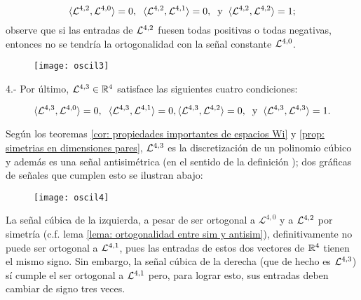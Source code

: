 \[
\langle \mathcal{L}^{4,2} , \mathcal{L}^{4,0} \rangle=0,
\hspace{0.2cm}
\langle \mathcal{L}^{4,2} , \mathcal{L}^{4,1} \rangle=0,
\hspace{0.2cm} \text{y} \hspace{0.2cm}
\langle \mathcal{L}^{4,2} , \mathcal{L}^{4,2} \rangle=1;
\]
observe que si las entradas de 
$\mathcal{L}^{4,2}$ fuesen todas positivas o todas negativas,
entonces no se tendría la ortogonalidad
con la señal constante $\mathcal{L}^{4,0}$.


\begin{figure}[H]
\texttt{[image: oscil3]}
\end{figure}

4.- Por último, $\mathcal{L}^{4,3} \in \mathbb{R}^{4}$ satisface
las siguientes cuatro condiciones: 

\[
\langle \mathcal{L}^{4,3} , \mathcal{L}^{4,0} \rangle=0,
\hspace{0.2cm}
\langle \mathcal{L}^{4,3} , \mathcal{L}^{4,1} \rangle=0,
\langle \mathcal{L}^{4,3} , \mathcal{L}^{4,2} \rangle=0,
\hspace{0.2cm} \text{y} \hspace{0.2cm}
\langle \mathcal{L}^{4,3} , \mathcal{L}^{4,3} \rangle=1.
\]

Según los teoremas 
\ref{cor: propiedades importantes de espacios Wi}
y \ref{prop: simetrias en dimensiones pares},
$\mathcal{L}^{4,3}$ es la discretización de un polinomio
cúbico y además es una señal antisimétrica (en el sentido de la definición
); dos gráficas de señales que cumplen esto se ilustran abajo:

\begin{figure}[H]
	\texttt{[image: oscil4]}
\end{figure}

La señal cúbica de la izquierda, a pesar de 
ser ortogonal a $\mathcal{L}^{4,0}$ y a $\mathcal{L}^{4,2}$ por 
simetría (c.f. lema
\ref{lema: ortogonalidad entre sim y antisim}), 
definitivamente no puede ser ortogonal
a $\mathcal{L}^{4,1}$, pues las entradas de estos dos vectores de 
$\mathbb{R}^{4}$ tienen el mismo signo. Sin embargo, la señal cúbica 
de la derecha (que de hecho es $\mathcal{L}^{4,3}$) sí cumple el ser
ortogonal a $\mathcal{L}^{4,1}$ pero, para lograr esto, sus
entradas deben cambiar de signo tres veces.


